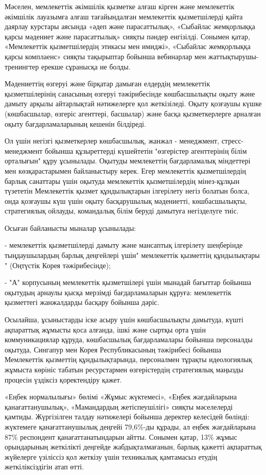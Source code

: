 \begin{multicols}{2}
Мәселен, мемлекеттік әкімшілік қызметке алғаш кірген және мемлекеттік
әкімшілік лауазымға алғаш тағайындалған мемлекеттік қызметшілерді қайта
даярлау курстары аясында «әдеп және парасаттылық», «Сыбайлас жемқорлыққа
қарсы мәдениет және парасаттылық» сияқты пәндер енгізілді. Сонымен
қатар, «Мемлекеттік қызметшілердің этикасы мен имиджі», «Сыбайлас
жемқорлыққа қарсы комплаенс» сияқты тақырыптар бойынша вебинарлар мен
жаттықтырушы-тренингтер ерекше сұранысқа ие болды.

Мәдениеттің өзгеруі және бірқатар дамыған елдердің мемлекеттік
қызметшілерінің санасының өзгеруі тәжірибесінде көшбасшылықты оқыту және
дамыту арқылы айтарлықтай нәтижелерге қол жеткізіледі. Оқыту қозғаушы
күшке (көшбасшылар, өзгеріс агенттері, басшылар) және басқа
қызметкерлерге арналған оқыту бағдарламаларының кешенін білдіреді.

Ол үшін негізгі қызметкерлер көшбасшылық, жанжал - менеджмент,
стресс-менеджмент бойынша құзыреттерді күшейтетін "өзгерістер
агенттерінің білім орталығын" құру ұсынылады. Оқытуды мемлекеттің
бағдарламалық міндеттері мен көзқарастарымен байланыстыру керек. Егер
мемлекеттік қызметшілердің барлық санаттары үшін оқытуда мемлекеттік
қызметшілердің мінез-құлқын түзететін Мемлекеттік қызмет құндылықтарын
ілгерілету негіз болатын болса, онда қозғаушы күш үшін оқыту
басқарушылық мәдениетті, көшбасшылықты, стратегиялық ойлауды, командалық
білім беруді дамытуға негізделуге тиіс.

Осыған байланысты мыналар ұсынылады:

- мемлекеттік қызметшілерді дамыту және мансаптық ілгерілету шеңберінде
тыңдаушылардың барлық деңгейлері үшін" мемлекеттік қызметтің
құндылықтары " (Оңтүстік Корея тәжірибесінде);

- "А" корпусының мемлекеттік қызметшілері үшін мынадай бағыттар бойынша
оқытудың арнаулы қысқа мерзімді бағдарламаларын құруға: мемлекеттік
қызметтегі жанжалдарды басқару бойынша дәріс.

Осылайша, ұсыныстарды іске асыру үшін көшбасшылықты дамытуда, күшті
ақпараттық жұмысты қоса алғанда, ішкі және сыртқы орта үшін
коммуникациялар құруда, көшбасшылық бағдарламалары бойынша персоналды
оқытуда, Сингапур мен Корея Республикасының тәжірибесі бойынша
Мемлекеттік қызметтің құндылықтарында, персоналмен тұрақты идеологиялық
жұмыста көрініс табатын ресурстармен өзгерістердің стратегиялық маңызды
процесін үздіксіз қоректендіру қажет.

«Еңбек нормалылығы» бөлімі «Жұмыс жүктемесі», «Еңбек жағдайларына
қанағаттанушылық», «Мамандардың жетіспеушілігі» сияқты мәселелерді
қамтиды. Жүргізілген талдау нәтижелері бойынша деректер келесідей
бөлінді: жүктемеге қанағаттанушылық деңгейі 79,6\%-ды құрады, ал еңбек
жағдайларына 87\% респондент қанағаттанатындарын айтты. Сонымен қатар,
13\% жұмыс орындарының жеткілікті деңгейде жабдықталмағанын, барлық
қажетті ақпараттық жүйелерге үзіліссіз қол жеткізу үшін техникалық
қамтамасыз етудің жеткіліксіздігін атап өтті.


\end{multicols}
